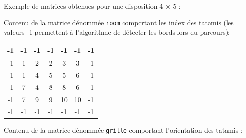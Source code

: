 Exemple de matrices obtenues pour une disposition 4 $\times$ 5 :

\setlength{\columnseprule}{1pt}
\setlength{\columnsep}{1cm}
\begin{multicols}{2}

    Contenu de la matrice dénommée \texttt{room} comportant les index des tatamis (les valeurs -1 permettent à l’algorithme de détecter les bords lors du parcours):

    \begin{center}
        \begin{tabular}{|c |c |c |c |c |c |c |} \hline
            -1 & -1                    & -1                         & -1                         & -1                          & -1                          & -1 \\ \hline
            -1 & \cellcolor{tsyellow}1 & \cellcolor{tsforestgreen}2 & \cellcolor{tsforestgreen}2 & \cellcolor{tsforestgreen}3  & \cellcolor{tsforestgreen}3  & -1 \\ \hline
            -1 & \cellcolor{tsyellow}1 & \cellcolor{tsyellow}4      & \cellcolor{tsforestgreen}5 & \cellcolor{tsforestgreen}5  & \cellcolor{tsyellow}6       & -1 \\ \hline
            -1 & \cellcolor{tsyellow}7 & \cellcolor{tsyellow}4      & \cellcolor{tsforestgreen}8 & \cellcolor{tsforestgreen}8  & \cellcolor{tsyellow}6       & -1 \\ \hline
            -1 & \cellcolor{tsyellow}7 & \cellcolor{tsforestgreen}9 & \cellcolor{tsforestgreen}9 & \cellcolor{tsforestgreen}10 & \cellcolor{tsforestgreen}10 & -1 \\ \hline
            -1 & -1                    & -1                         & -1                         & -1                          & -1                          & -1 \\ \hline
        \end{tabular}

    \end{center}
   
    \columnbreak

    Contenu de la matrice dénommée \texttt{grille} comportant l’orientation des tatamis :
  
    \begin{center}
       

\end{center}
\end{multicols}
